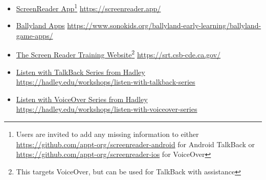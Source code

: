 \begin{itemize}[leftmargin=*]
\item \href{https://screenreader.app/}{ScreenReader App}\footnote{\raggedright Users are invited to add any missing information to either \href{https://github.com/appt-org/screenreader-android}{https://github.com/appt-org/screenreader-android} for Android TalkBack or \href{https://github.com/appt-org/screenreader-ios}{https://github.com/appt-org/screenreader-ios} for VoiceOver} \break\url{https://screenreader.app/}
\item \href{https://www.sonokids.org/ballyland-early-learning/ballyland-game-apps/}{Ballyland Apps} \break\url{https://www.sonokids.org/ballyland-early-learning/ballyland-game-apps/}
\item \href{https://srt.csb-cde.ca.gov/}{The Screen Reader Training Website}\footnote{\raggedright This targets VoiceOver, but can be used for TalkBack with assistance} \break\url{https://srt.csb-cde.ca.gov/}
\item \href{https://hadley.edu/workshops/listen-with-talkback-series}{Listen with TalkBack Series from Hadley} \break\url{https://hadley.edu/workshops/listen-with-talkback-series}
\item \href{https://hadley.edu/workshops/listen-with-voiceover-series}{Listen with VoiceOver Series from Hadley} \break\url{https://hadley.edu/workshops/listen-with-voiceover-series}
\end{itemize}

